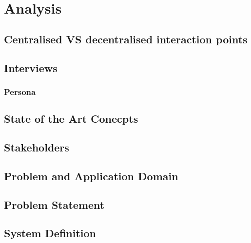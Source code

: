 \chapter{Analysis}


\section{Centralised VS decentralised interaction points}


\section{Interviews}





\subsection{Persona}


% 
\section{State of the Art Conecpts}


\section{Stakeholders}


\section{Problem and Application Domain}


\section{Problem Statement}


\section{System Definition}


